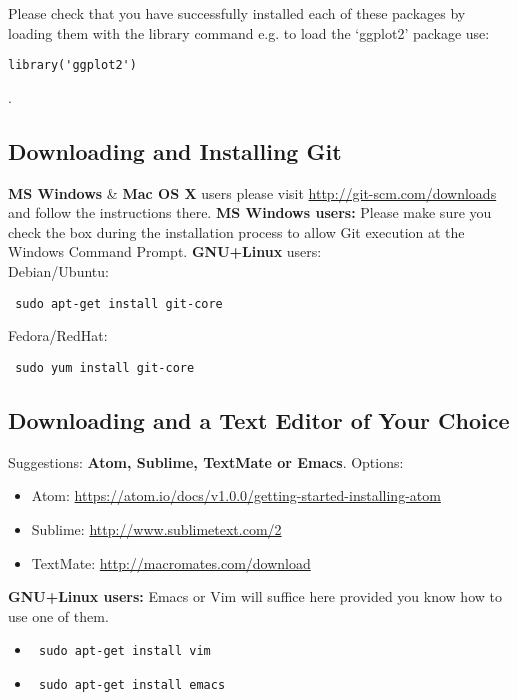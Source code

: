 \documentclass{article}[12pt]
\begin{document}
Please check that you have successfully installed each of these packages by loading them with the library command e.g. to load the `ggplot2' package use:
\begin{verbatim}
library('ggplot2')
\end{verbatim}.

\subsection*{Downloading and Installing Git}
\textbf{MS Windows} \& \textbf{Mac OS X} users please visit \url{http://git-scm.com/downloads} and follow the instructions there.\newline
\textbf{MS Windows users:} Please make sure you check the box during the installation process to allow Git execution at the Windows Command Prompt.
\newline
\textbf{GNU+Linux} users:\\
Debian/Ubuntu: \begin{verbatim} sudo apt-get install git-core \end{verbatim} 
Fedora/RedHat: \begin{verbatim} sudo yum install git-core \end{verbatim}

\subsection*{Downloading and a Text Editor of Your Choice}
Suggestions: \textbf{Atom, Sublime, TextMate or Emacs}.
Options: \begin{itemize}
\item Atom: \url{https://atom.io/docs/v1.0.0/getting-started-installing-atom}
\item Sublime: \url{http://www.sublimetext.com/2}
\item TextMate: \url{http://macromates.com/download}
\end{itemize}

\textbf{GNU+Linux users:} Emacs or Vim will suffice here provided you know how to use one of them.
\begin{itemize}
\item \begin{verbatim} sudo apt-get install vim \end{verbatim} 
\item \begin{verbatim} sudo apt-get install emacs \end{verbatim} 
\end{itemize}
\end{document}
